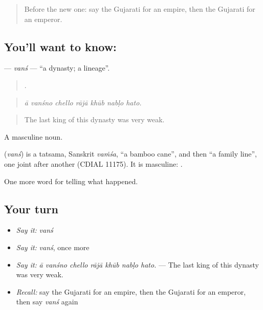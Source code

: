\label{lesson:GU-C324-vans}



\begin{quote}
Before the new one: say the Gujarati for an empire, then the Gujarati for an emperor.
\end{quote}

\subsection*{You'll want to know: }
\textbf{} — \emph{vanś} — \textquotedblleft{}a dynasty; a lineage\textquotedblright{}.

\begin{quote}
      .
\end{quote}

\begin{quote}
\emph{ā vanśno chello rājā khūb nabḷo hato.}
\end{quote}

\begin{quote}
The last king of this dynasty was very weak.
\end{quote}

A masculine noun.

\begin{cousinweb}
\textbf{} (\emph{vanś}) is a tatsama, Sanskrit \emph{vaṁśa}, \textquotedblleft{}a bamboo cane\textquotedblright{}, and then \textquotedblleft{}a family line\textquotedblright{}, one joint after another (CDIAL 11175). It is masculine: \textbf{  }.
\end{cousinweb}

\begin{grammarlens}[title={What you've built}]
One more word for telling what happened.
\end{grammarlens}

\subsection*{Your turn}
\begin{itemize}
\raggedright
  \item \emph{Say it:} \emph{vanś}
  \item \emph{Say it:} \emph{vanś}, once more
  \item \emph{Say it:} \emph{ā vanśno chello rājā khūb nabḷo hato.} — The last king of this dynasty was very weak.
  \item \emph{Recall:} say the Gujarati for an empire, then the Gujarati for an emperor, then say \emph{vanś} again
\end{itemize}

